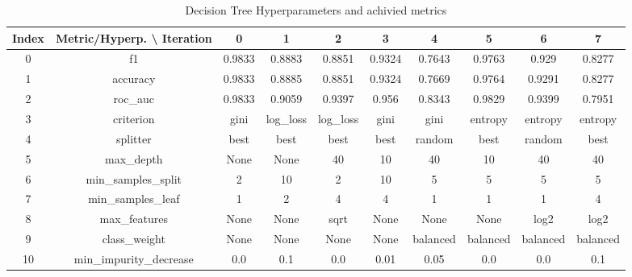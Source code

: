 \documentclass{article}%
\begin{document}
\begin{table}[h!]%
\caption{Decision Tree Hyperparameters and achivied metrics}%
\vspace{0.2cm}%
\centering%
\begin{tabular}{|c||c||c||c||c||c||c||c||c||c|}%
\hline%
Index&Metric/Hyperp. \textbackslash{} Iteration&0&1&2&3&4&5&6&7\\%
\hline%
0&f1&0.9833&0.8883&0.8851&0.9324&0.7643&0.9763&0.929&0.8277\\%
1&accuracy&0.9833&0.8885&0.8851&0.9324&0.7669&0.9764&0.9291&0.8277\\%
2&roc\_auc&0.9833&0.9059&0.9397&0.956&0.8343&0.9829&0.9399&0.7951\\%
3&criterion&gini&log\_loss&log\_loss&gini&gini&entropy&entropy&entropy\\%
4&splitter&best&best&best&best&random&best&random&best\\%
5&max\_depth&None&None&40&10&40&10&40&40\\%
6&min\_samples\_split&2&10&2&10&5&5&5&5\\%
7&min\_samples\_leaf&1&2&4&4&1&1&1&4\\%
8&max\_features&None&None&sqrt&None&None&None&log2&log2\\%
9&class\_weight&None&None&None&None&balanced&balanced&balanced&balanced\\%
10&min\_impurity\_decrease&0.0&0.1&0.0&0.01&0.05&0.0&0.0&0.1\\%
\hline%
\end{tabular}%
\end{table}

%
\end{document}
